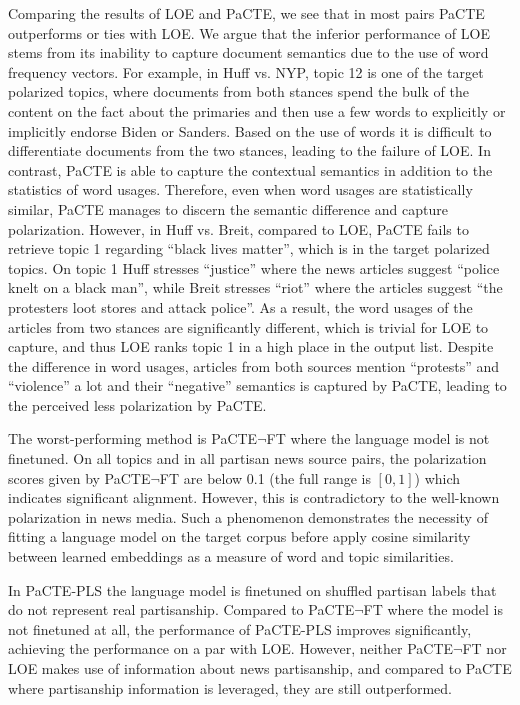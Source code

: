 \documentclass[11pt]{article}
\begin{document}
Comparing the results of LOE and PaCTE, we see that in most pairs PaCTE outperforms or ties with LOE. We argue that the inferior performance of LOE stems from its inability to capture document semantics due to the use of word frequency vectors. 
For example, in Huff vs. NYP, topic 12 is one of the target polarized topics, where documents from both stances spend the bulk of the content on the fact about the primaries and then use a few words to explicitly or implicitly endorse Biden or Sanders. Based on the use of words it is difficult to differentiate documents from the two stances, leading to the failure of LOE. In contrast, PaCTE is able to capture the contextual semantics in addition to the statistics of word usages. Therefore, even when word usages are statistically similar, PaCTE manages to discern the semantic difference and capture polarization.
However, in Huff vs. Breit, compared to LOE, PaCTE fails to retrieve topic 1 regarding ``black lives matter'', which is in the target polarized topics. On topic 1 Huff stresses ``justice'' where the news articles suggest ``police knelt on a black man'', while Breit stresses ``riot'' where the articles suggest ``the protesters loot stores and attack police''. As a result, the word usages of the articles from two stances are significantly different, which is trivial for LOE to capture, and thus LOE ranks topic 1 in a high place in the output list. Despite the difference in word usages, articles from both sources mention ``protests'' and ``violence'' a lot and their ``negative'' semantics is captured by PaCTE, leading to the perceived less polarization by PaCTE.

The worst-performing method is PaCTE$\neg$FT where the language model is not finetuned. On all topics and in all partisan news source pairs, the polarization scores given by PaCTE$\neg$FT are below 0.1 (the full range is $[0,1]$) which indicates significant alignment. However, this is contradictory to the well-known polarization in news media. Such a phenomenon demonstrates the necessity of fitting a language model on the target corpus before apply cosine similarity between learned embeddings as a measure of word and topic similarities.

In PaCTE-PLS the language model is finetuned on shuffled partisan labels that do not represent real partisanship. Compared to PaCTE$\neg$FT where the model is not finetuned at all, the performance of PaCTE-PLS improves significantly, achieving the performance on a par with LOE. However, neither PaCTE$\neg$FT nor LOE makes use of information about news partisanship, and compared to PaCTE where partisanship information is leveraged, they are still outperformed. 
\end{document}
